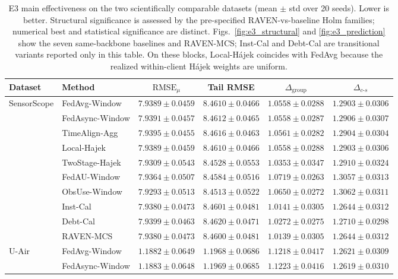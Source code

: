 \documentclass[letterpaper,journal]{IEEEtran}
\begin{document}
\begin{table}[t]
\centering
\caption{E3 main effectiveness on the two scientifically comparable datasets
(mean $\pm$ std over 20 seeds).  Lower is better.  Structural significance is
assessed by the pre-specified RAVEN-vs-baseline Holm families; numerical best and
statistical significance are distinct.
Figs.~\ref{fig:e3_structural} and \ref{fig:e3_prediction} show the seven
same-backbone baselines and RAVEN-MCS; Inst-Cal and Debt-Cal are transitional
variants reported only in this table.
On these blocks, Local-H\'ajek coincides with FedAvg because the realized
within-client H\'ajek weights are uniform.}
\label{tab:main_effectiveness}
\setlength{\tabcolsep}{4.2pt}
\begin{tabular}{llcccc}
\toprule
Dataset & Method & $\mathrm{RMSE}_{\mu}$ & Tail RMSE &
$\Delta_{\mathrm{group}}$ & $\Delta_{c\text{-}s}$\\
\midrule
\multirow{10}{*}{SensorScope}
& FedAvg-Window    & $7.9389\pm0.0459$ & $8.4610\pm0.0466$ & $1.0558\pm0.0288$ & $1.2903\pm0.0306$\\
& FedAsync-Window  & $7.9391\pm0.0457$ & $8.4612\pm0.0465$ & $1.0558\pm0.0287$ & $1.2906\pm0.0307$\\
& TimeAlign-Agg    & $7.9395\pm0.0455$ & $8.4616\pm0.0463$ & $1.0561\pm0.0282$ & $1.2904\pm0.0304$\\
& Local-Hajek      & $7.9389\pm0.0459$ & $8.4610\pm0.0466$ & $1.0558\pm0.0288$ & $1.2903\pm0.0306$\\
& TwoStage-Hajek   & $7.9309\pm0.0543$ & $8.4528\pm0.0553$ & $1.0353\pm0.0347$ & $1.2910\pm0.0324$\\
& FedAU-Window     & $7.9364\pm0.0507$ & $8.4584\pm0.0516$ & $1.0719\pm0.0263$ & $1.3057\pm0.0313$\\
& ObsUse-Window    & $\mathbf{7.9293}\pm0.0513$ & $\mathbf{8.4513}\pm0.0522$ & $1.0650\pm0.0272$ & $1.3062\pm0.0311$\\
& Inst-Cal         & $7.9380\pm0.0473$ & $8.4601\pm0.0481$ & $1.0141\pm0.0305$ & $1.2644\pm0.0312$\\
& Debt-Cal         & $7.9399\pm0.0463$ & $8.4620\pm0.0471$ & $1.0272\pm0.0275$ & $1.2710\pm0.0298$\\
& RAVEN-MCS        & $7.9380\pm0.0473$ & $8.4600\pm0.0481$ & $\mathbf{1.0139}\pm0.0305$ & $\mathbf{1.2644}\pm0.0312$\\
\midrule
\multirow{10}{*}{U-Air}
& FedAvg-Window    & $1.1882\pm0.0649$ & $1.1968\pm0.0686$ & $1.1218\pm0.0417$ & $1.2621\pm0.0309$\\
& FedAsync-Window  & $1.1883\pm0.0648$ & $1.1969\pm0.0685$ & $1.1223\pm0.0416$ & $1.2619\pm0.0310$\\

\end{tabular}
\end{table}
\end{document}
